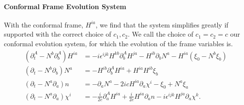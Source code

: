 \documentclass[10pt]{report}
\theoremstyle{definition}
\begin{document}
    \paragraph{Conformal Frame Evolution System} With the conformal frame, $H^{ia}$, we find that the system simplifies greatly if supported with the correct choice of $c_1,c_2$. We call the choice of $c_1 = c_2 = c$ our conformal evolution system, for which the evolution of the frame variables is.
    \begin{equation}
        \begin{aligned}
            (\partial^A_t - N^b \partial^A_b) H^{ia} &= -i \epsilon^{ijk} H^{kb} \partial^A_b H^{ja} - H^{ib} \partial_b N^a - H^{ia} (\xi_0 - N^b \xi_b) \\
            (\partial_t - N^b \partial_b) N^a &= - H^{ib} \partial_b^A H^{ia} + H^{ia} H^{ib} \xi_b \\
            (\partial_t - N^a \partial_a) n &= - \partial_a N^a - 2ic H^{ia} \partial_a \chi^i - \xi_0 + N^a \xi_a \\
            (\partial_t - N^a \partial_a) \chi^i &= -\frac{i}{2 c} \partial^A_a H^{ia} + \frac{i}{2c} H^{ia} \partial_a n - i \epsilon^{ijk} H^{ja} \partial_a \chi^k.
        \end{aligned}\label{eq:num-plebanski-conformally-seperated-frame-evolution-system}
    \end{equation}
\end{document}

